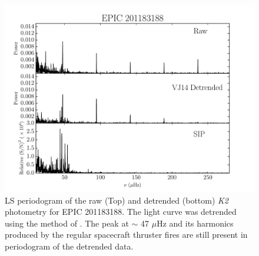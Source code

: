\documentclass[useAMS, usenatbib, preprint, 12pt]{aastex}
\begin{document}
\begin{figure}
\begin{center}
\includegraphics[width=6in, clip=true]{rawvbg_201183188.pdf}
\caption{LS periodogram of the raw (Top) and detrended
	 (bottom) {\it K2} photometry for EPIC 201183188. The light curve was
 	 detrended using the method of \citet{Vanderburg2014}. The peak at
	 $\sim$ 47 $\mu$Hz and its harmonics produced by the regular spacecraft
	 thruster fires are still present in periodogram of the detrended
	 data.}
\label{fig:raw}
\end{center}
\end{figure}
\end{document}
